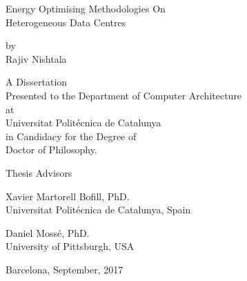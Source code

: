 \thispagestyle{empty}

\begin{center}


{\LARGE Energy Optimising Methodologies On \\
    \vspace{0.5em}
    Heterogeneous Data Centres}

\vspace{1.0cm}

\begin{large}
    {\large by}\\
{\large Rajiv Nishtala}\\
\vspace{.5cm}
\end{large}

\vspace{1.0cm}

{\large A Dissertation \\
    Presented to the Department of Computer Architecture \\
    at \\
    Universitat Polit\'ecnica de Catalunya\\
    in Candidacy for the Degree of \\
    Doctor of Philosophy.}
\end{center}

\vspace{1.0cm}%

{\large Thesis Advisors}%

\vspace{0.5cm}%

{\hspace{0em} \large Xavier Martorell Bofill, PhD.}\\
{\hspace*{1.4em} \large Universitat Polit\'ecnica de Catalunya, Spain}

\vspace*{1.0cm}%
{\hspace{0cm} \large Daniel Moss\'e, PhD.}\\
{\hspace*{1.4em} \large University of Pittsburgh, USA}%
\vspace*{0.5cm}

\begin{center}
{\large Barcelona, September, 2017}
\end{center}
